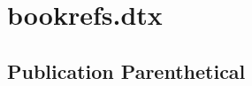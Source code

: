 \documentclass{article}
\makeatletter
\def\hi@newcite#1#2#3#4{}
\makeatother
\begin{document}
\hi@newcite{citecontainer}{A citation in another citation}{other}{%
    \hi@citecontainer@settype
    \hi@citecontainer@init{#1}%
    \edef\reserved@a{%
        {#1}%
        \expandafter\noexpand\csname fc@#1\endcsname
        \expandafter\noexpand\csname tcpg@\hi@kv@in\endcsname
    }%
    \expandafter\hi@citecontainer@fc\reserved@a
    \edef\reserved@a{%
        {#1}%
        \expandafter\noexpand\csname sc@#1\endcsname
        \hi@ifset\hi@kv@citation{%
            \expandafter\noexpand\csname sc@\hi@kv@citation\endcsname
        }{\relax}%
    }%
    \expandafter\hi@citecontainer@sc\reserved@a
    \edef\reserved@a{%
        {#1}%
        \expandafter\noexpand\csname lc@#1\endcsname
        \hi@ifset\hi@kv@citation{%
            \expandafter\noexpand\csname
                \@ifundefined{lc@\hi@kv@citation}{fc}{lc}@\hi@kv@citation
            \endcsname
        }{\relax}%
        \expandafter\noexpand\csname fc@\hi@kv@in\endcsname
        \expandafter\noexpand\csname hi@citecontainer@data@#1\endcsname
    }
    \expandafter\hi@citecontainer@lc\reserved@a
}

\section{bookrefs.dtx}

\subsection{Publication Parenthetical}

\begingroup
    \hi@param@clear

    \hi@book@pubparen
    \AssertMacro\hi@book@paren{}

    \def\hi@kv@year{2010}
    \hi@book@pubparen
    \AssertMacro{}%
\end{document}
